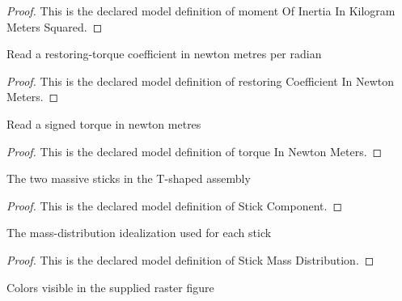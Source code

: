 \begin{proof}
  This is the declared model definition of moment Of Inertia In Kilogram Meters Squared.
\end{proof}
\begin{definition}
  \label{def:physics:phyx-mini-0263:phyxminiproblems-problemphyxmini0263-restoringcoefficientinnewtonmeters}
  Read a restoring-torque coefficient in newton metres per radian
\end{definition}
\begin{proof}
  This is the declared model definition of restoring Coefficient In Newton Meters.
\end{proof}
\begin{definition}
  \label{def:physics:phyx-mini-0263:phyxminiproblems-problemphyxmini0263-torqueinnewtonmeters}
  Read a signed torque in newton metres
\end{definition}
\begin{proof}
  This is the declared model definition of torque In Newton Meters.
\end{proof}
\begin{definition}
  \label{def:physics:phyx-mini-0263:phyxminiproblems-problemphyxmini0263-stickcomponent}
  The two massive sticks in the T-shaped assembly
\end{definition}
\begin{proof}
  This is the declared model definition of Stick Component.
\end{proof}
\begin{definition}
  \label{def:physics:phyx-mini-0263:phyxminiproblems-problemphyxmini0263-stickmassdistribution}
  The mass-distribution idealization used for each stick
\end{definition}
\begin{proof}
  This is the declared model definition of Stick Mass Distribution.
\end{proof}
\begin{definition}
  \label{def:physics:phyx-mini-0263:phyxminiproblems-problemphyxmini0263-figurecolor}
  Colors visible in the supplied raster figure
\end{definition}
